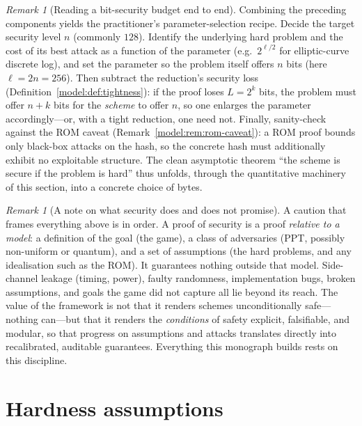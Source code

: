 \documentclass[11pt,a4paper]{article}
\theoremstyle{definition}
\theoremstyle{remark}
\newtheorem{remark}[theorem]{Remark}
\begin{document}
\begin{remark}[Reading a bit-security budget end to end]\label{model:rem:budget}
Combining the preceding components yields the practitioner's parameter-selection
recipe. Decide the target security level \(n\) (commonly \(128\)). Identify the
underlying hard problem and the cost of its best attack as a function of the
parameter (e.g.\ \(2^{\ell/2}\) for elliptic-curve discrete log), and set the
parameter so the problem itself offers \(n\) bits (here \(\ell = 2n = 256\)).
Then subtract the reduction's security loss
(Definition~\ref{model:def:tightness}): if the proof loses \(L = 2^{k}\) bits, the
problem must offer \(n + k\) bits for the \emph{scheme} to offer \(n\), so one
enlarges the parameter accordingly---or, with a tight reduction, one need not.
Finally, sanity-check against the ROM caveat
(Remark~\ref{model:rem:rom-caveat}): a ROM proof bounds only black-box attacks on
the hash, so the concrete hash must additionally exhibit no exploitable structure.
The clean asymptotic theorem ``the scheme is secure if the problem is hard'' thus
unfolds, through the quantitative machinery of this section, into a concrete
choice of bytes.
\end{remark}

\begin{remark}[A note on what security does and does not promise]\label{model:rem:scope}
A caution that frames everything above is in order. A proof of security is a proof
\emph{relative to a model}: a definition of the goal (the game), a class of
adversaries (PPT, possibly non-uniform or quantum), and a set of assumptions (the
hard problems, and any idealisation such as the ROM). It guarantees nothing
outside that model. Side-channel leakage (timing, power), faulty randomness,
implementation bugs, broken assumptions, and goals the game did not capture all
lie beyond its reach. The value of the framework is not that it renders schemes
unconditionally safe---nothing can---but that it renders the \emph{conditions} of
safety explicit, falsifiable, and modular, so that progress on assumptions and
attacks translates directly into recalibrated, auditable guarantees. Everything
this monograph builds rests on this discipline.
\end{remark}

\clearpage

\section{Hardness assumptions}\label{sec:assumptions}
\end{document}
